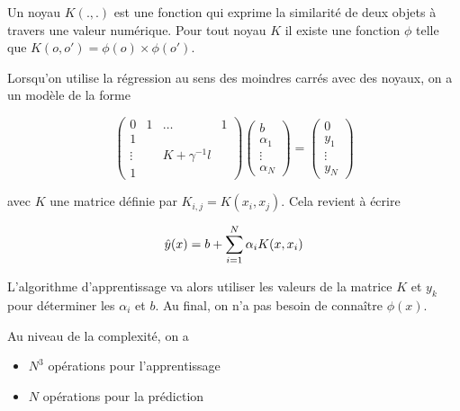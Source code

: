 Un noyau $K(., .)$ est une fonction qui exprime la similarité de deux objets à travers une valeur numérique. Pour tout noyau $K$ il existe une fonction $\phi$ telle que $K(o, o') = \phi(o) \times \phi(o')$.

Lorsqu'on utilise la régression au sens des moindres carrés avec des noyaux, on a un modèle de la forme

$$\begin{pmatrix}
0 & 1 & \dots & 1 \\ 
1 &   &   &   \\ 
\vdots &   & K + \gamma^{-1}l &   \\ 
1 &   &   &  
\end{pmatrix} \begin{pmatrix}
b \\ 
\alpha_1 \\ 
\vdots \\ 
\alpha_N
\end{pmatrix} = \begin{pmatrix}
0 \\ 
y_1 \\ 
\vdots \\ 
y_N
\end{pmatrix} $$

avec $K$ une matrice définie par $K_{i, j} = K(x_i, x_j)$. Cela revient à écrire

$$\hat{y}(x) = b + \sum_{i = 1}^N \alpha_i K(x, x_i)$$

L'algorithme d'apprentissage va alors utiliser les valeurs de la matrice $K$ et $y_k$ pour déterminer les $\alpha_i$ et $b$. Au final, on n'a pas besoin de connaître $\phi(x)$.

Au niveau de la complexité, on a 

\begin{itemize}
	\item $N^3$ opérations pour l'apprentissage
	\item $N$ opérations pour la prédiction
\end{itemize}

	


% 
		
